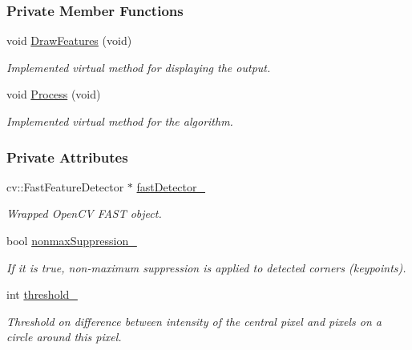 \subsubsection*{Private Member Functions}
\begin{DoxyCompactItemize}
\item 
void \hyperlink{group___feature_extractor_a765f433c231d5f0d088beeaa77aa0e7a}{Draw\-Features} (void)
\begin{DoxyCompactList}\small\item\em Implemented virtual method for displaying the output. \end{DoxyCompactList}\item 
void \hyperlink{group___feature_extractor_a4bbf87c97bd86bf44d4c021b053a7e66}{Process} (void)
\begin{DoxyCompactList}\small\item\em Implemented virtual method for the algorithm. \end{DoxyCompactList}\end{DoxyCompactItemize}
\subsubsection*{Private Attributes}
\begin{DoxyCompactItemize}
\item 
cv\-::\-Fast\-Feature\-Detector $\ast$ \hyperlink{group___feature_extractor_a4978fabcb2c02a6828672ecf09b1fbec}{fast\-Detector\-\_\-}
\begin{DoxyCompactList}\small\item\em Wrapped Open\-C\-V F\-A\-S\-T object. \end{DoxyCompactList}\item 
bool \hyperlink{group___feature_extractor_afc991a85e5ee2d8f1a52657eee8d380d}{nonmax\-Suppression\-\_\-}
\begin{DoxyCompactList}\small\item\em If it is true, non-\/maximum suppression is applied to detected corners (keypoints). \end{DoxyCompactList}\item 
int \hyperlink{group___feature_extractor_afc261d12e34223dc377b1ea8f8d3a773}{threshold\-\_\-}
\begin{DoxyCompactList}\small\item\em Threshold on difference between intensity of the central pixel and pixels on a circle around this pixel. \end{DoxyCompactList}\end{DoxyCompactItemize}


